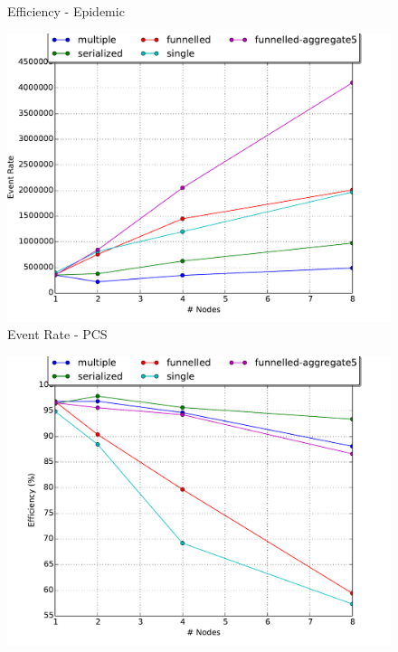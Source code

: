 \documentclass[11pt]{book}
\begin{document}
\begin{figure}
\begin{minipage}{.5\textwidth}
\begin{center}
      Efficiency - Epidemic \\
    \end{center}
  \end{minipage}
  \begin{minipage}{.5\textwidth}
    \begin{center}
      \includegraphics[width=\textwidth,keepaspectratio,quiet]{figs/partitioning_communication/communication_pcs_eventrate.pdf} \\
      Event Rate - PCS \\
    \end{center}
  \end{minipage}%
  \hfill
  \begin{minipage}{.5\textwidth}
    \begin{center}
      \includegraphics[width=\textwidth,keepaspectratio,quiet]{figs/partitioning_communication/communication_pcs_efficiency.pdf} \\

\end{center}
\end{minipage}
\end{figure}
\end{document}
